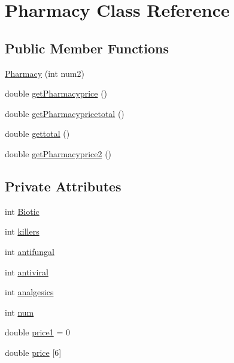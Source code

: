 \hypertarget{class_pharmacy}{}\section{Pharmacy Class Reference}
\label{class_pharmacy}
\subsection*{Public Member Functions}
\begin{DoxyCompactItemize}
\item 
\mbox{\hyperlink{class_pharmacy_a9ba64f91ceff049fec74559a173eb74f}{Pharmacy}} (int num2)
\item 
double \mbox{\hyperlink{class_pharmacy_aa3a5b0a8d99260622d085860a149498f}{get\+Pharmacyprice}} ()
\item 
double \mbox{\hyperlink{class_pharmacy_afeac950beb2e618159befa7cec3c539f}{get\+Pharmacypricetotal}} ()
\item 
double \mbox{\hyperlink{class_pharmacy_a871e7f14e4d884ed9f30ad41eda13131}{gettotal}} ()
\item 
double \mbox{\hyperlink{class_pharmacy_a1406c378a278f08eb7525ee96c7326b4}{get\+Pharmacyprice2}} ()
\end{DoxyCompactItemize}
\subsection*{Private Attributes}
\begin{DoxyCompactItemize}
\item 
int \mbox{\hyperlink{class_pharmacy_a12656f591be41bc12e2f5d91130e8437}{Biotic}}
\item 
int \mbox{\hyperlink{class_pharmacy_af559aadd97b3127ef1994fc3f52fb56a}{killers}}
\item 
int \mbox{\hyperlink{class_pharmacy_a1d67fcf7a2cdd94e56e04b9e37ac3a38}{antifungal}}
\item 
int \mbox{\hyperlink{class_pharmacy_ac42064cd87ce6c35abd2f49e471627dd}{antiviral}}
\item 
int \mbox{\hyperlink{class_pharmacy_adc3b8d689bff2a56e56764711f4f4779}{analgesics}}
\item 
int \mbox{\hyperlink{class_pharmacy_aaa89b1e3b9b8738611c2e87b8e3a2a07}{num}}
\item 
double \mbox{\hyperlink{class_pharmacy_a1be725848c7917118634c633d5986b0c}{price1}} = 0
\item 
double \mbox{\hyperlink{class_pharmacy_a18d9bdfcb9c03a5f5b752d6f2abc6116}{price}} \mbox{[}6\mbox{]}
\end{DoxyCompactItemize}


